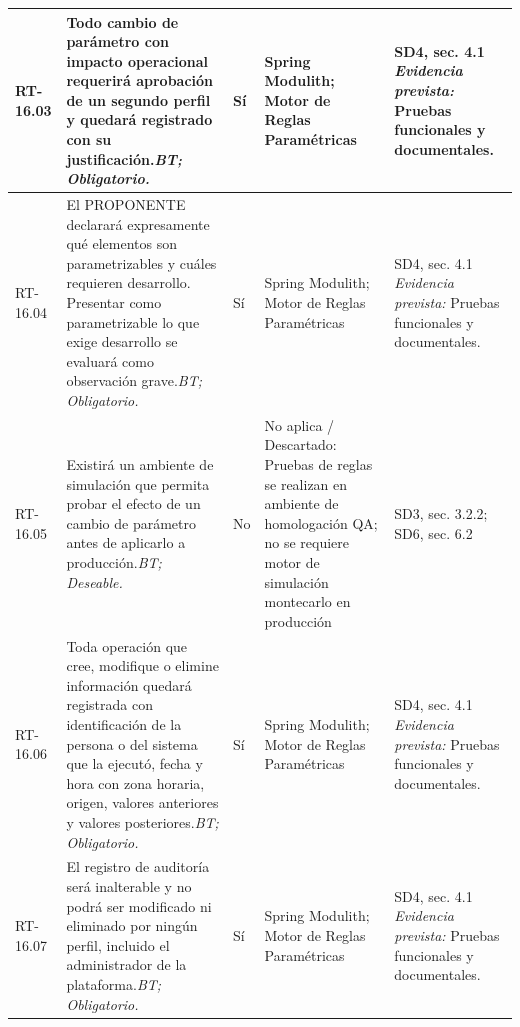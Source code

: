 \begin{paginaHorizontalSynaptix}
\begin{longtable}{|L{0.09\AnchoMatrizTDoce}|L{0.385\AnchoMatrizTDoce}|L{0.065\AnchoMatrizTDoce}|L{0.18\AnchoMatrizTDoce}|L{0.28\AnchoMatrizTDoce}|}
RT-\allowbreak{}16.\allowbreak{}03 &
Todo cambio de parámetro con impacto operacional requerirá aprobación de un segundo perfil y quedará registrado con su justificación.\newline\textit{BT; Obligatorio.} &
Sí &
Spring Modulith; Motor de Reglas Paramétricas &
SD4, sec. 4.1 \newline\textit{Evidencia prevista:} Pruebas funcionales y documentales. \\ \hline

RT-\allowbreak{}16.\allowbreak{}04 &
El PROPONENTE declarará expresamente qué elementos son parametrizables y cuáles requieren desarrollo. Presentar como parametrizable lo que exige desarrollo se evaluará como observación grave.\newline\textit{BT; Obligatorio.} &
Sí &
Spring Modulith; Motor de Reglas Paramétricas &
SD4, sec. 4.1 \newline\textit{Evidencia prevista:} Pruebas funcionales y documentales. \\ \hline

RT-\allowbreak{}16.\allowbreak{}05 &
Existirá un ambiente de simulación que permita probar el efecto de un cambio de parámetro antes de aplicarlo a producción.\newline\textit{BT; Deseable.} &
No &
No aplica / Descartado: Pruebas de reglas se realizan en ambiente de homologación QA; no se requiere motor de simulación montecarlo en producción &
SD3, sec. 3.2.2; SD6, sec. 6.2 \\ \hline

RT-\allowbreak{}16.\allowbreak{}06 &
Toda operación que cree, modifique o elimine información quedará registrada con identificación de la persona o del sistema que la ejecutó, fecha y hora con zona horaria, origen, valores anteriores y valores posteriores.\newline\textit{BT; Obligatorio.} &
Sí &
Spring Modulith; Motor de Reglas Paramétricas &
SD4, sec. 4.1 \newline\textit{Evidencia prevista:} Pruebas funcionales y documentales. \\ \hline

RT-\allowbreak{}16.\allowbreak{}07 &
El registro de auditoría será inalterable y no podrá ser modificado ni eliminado por ningún perfil, incluido el administrador de la plataforma.\newline\textit{BT; Obligatorio.} &
Sí &
Spring Modulith; Motor de Reglas Paramétricas &
SD4, sec. 4.1 \newline\textit{Evidencia prevista:} Pruebas funcionales y documentales. \\ \hline


\end{longtable}
\end{paginaHorizontalSynaptix}
